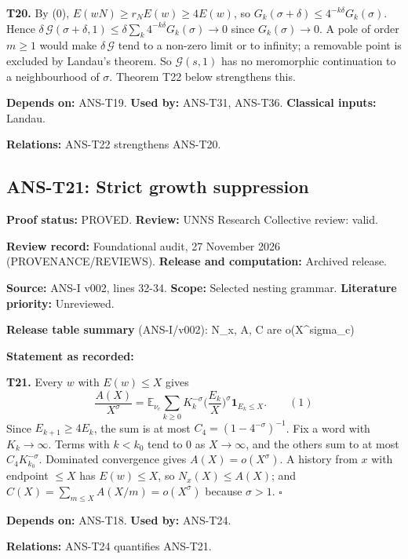 \documentclass[
  11pt,
]{article}
\begin{document}
\textbf{T20.} By (0), \(E(wN)\ge r_NE(w)\ge4E(w)\), so
\(G_k(\sigma+\delta)\le4^{-k\delta}G_k(\sigma)\). Hence
\(\delta\,\mathcal G(\sigma+\delta,1)\le\delta\sum_k4^{-k\delta}G_k(\sigma)\to0\)
since \(G_k(\sigma)\to0\). A pole of order \(m\ge1\) would make
\(\delta\,\mathcal G\) tend to a non-zero limit or to infinity; a
removable point is excluded by Landau's theorem. So \(\mathcal G(s,1)\)
has no meromorphic continuation to a neighbourhood of \(\sigma\).
Theorem T22 below strengthens this.

\textbf{Depends on:} ANS-T19. \textbf{Used by:} ANS-T31, ANS-T36.
\textbf{Classical inputs:} Landau.

\textbf{Relations:} ANS-T22 strengthens ANS-T20.

\hypertarget{ans-t21-strict-growth-suppression}{%
\subsection{ANS-T21: Strict growth
suppression}\label{ans-t21-strict-growth-suppression}}

\textbf{Proof status:} PROVED. \textbf{Review:} UNNS Research Collective
review: valid.

\textbf{Review record:} Foundational audit, 27 November 2026
(PROVENANCE/REVIEWS). \textbf{Release and computation:} Archived
release.

\textbf{Source:} ANS-I v002, lines 32-34. \textbf{Scope:} Selected
nesting grammar. \textbf{Literature priority:} Unreviewed.

\textbf{Release table summary} (ANS-I/v002): N\_x, A, C are
o(X\^{}sigma\_c)

\textbf{Statement as recorded:}

\textbf{T21.} Every \(w\) with \(E(w)\le X\) gives
\[\frac{A(X)}{X^{\sigma}}=\mathbb E_{\nu_c}\sum_{k\ge0}K_k^{-\sigma}\Big(\frac{E_k}{X}\Big)^{\sigma}\mathbf 1_{E_k\le X}.\qquad(1)\]
Since \(E_{k+1}\ge4E_k\), the sum is at most
\(C_4=(1-4^{-\sigma})^{-1}\). Fix a word with \(K_k\to\infty\). Terms
with \(k<k_0\) tend to \(0\) as \(X\to\infty\), and the others sum to at
most \(C_4K_{k_0}^{-\sigma}\). Dominated convergence gives
\(A(X)=o(X^{\sigma})\). A history from \(x\) with endpoint \(\le X\) has
\(E(w)\le X\), so \(N_x(X)\le A(X)\); and
\(C(X)=\sum_{m\le X}A(X/m)=o(X^\sigma)\) because \(\sigma>1\).
\(\square\)

\textbf{Depends on:} ANS-T18. \textbf{Used by:} ANS-T24.

\textbf{Relations:} ANS-T24 quantifies ANS-T21.
\end{document}
